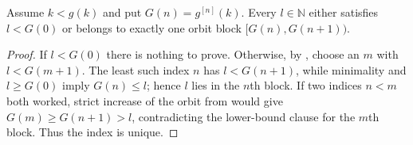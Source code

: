 \begin{lemma}
Assume $k<g(k)$ and put $G(n)=g^{[n]}(k)$.  Every $l\in\mathbb N$ either
satisfies $l<G(0)$ or belongs to exactly one orbit block
$[G(n),G(n+1))$.
\end{lemma}
\begin{proof}
If $l<G(0)$ there is nothing to prove.  Otherwise, by
, choose an $m$ with $l<G(m+1)$.  The least such
index $n$ has $l<G(n+1)$, while minimality and $l\geq G(0)$ imply
$G(n)\leq l$; hence $l$ lies in the $n$th block.  If two indices $n<m$ both
worked, strict increase of the orbit from  would give
$G(m)\geq G(n+1)>l$, contradicting the lower-bound clause for the $m$th
block.  Thus the index is unique.
\end{proof}
